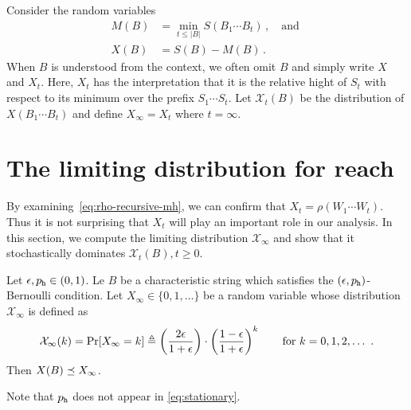   Consider the random variables 
  \begin{align}
    M(B) &= \min_{t \leq |B|} S(B_1 \cdots B_t)\,, \quad\text{and } \\
    X(B) &= S(B) - M(B)\,. \label{eq:X-walk}
  \end{align}
  When $B$ is understood from the context, we often omit $B$ and simply write $X$ and $X_t$.
  Here, $X_t$ has the interpretation that it is the relative hight of $S_t$ 
  with respect to its minimum over the prefix $S_1 \cdots S_t$. 
  Let $\mathcal{X}_t(B)$ be the distribution of $X(B_1 \cdots B_t)$ 
  and define $X_\infty = X_t$ where $t = \infty$. 


  \section{The limiting distribution for reach}\label{sec:stationary-dist-reach}
  By examining~\eqref{eq:rho-recursive-mh}, 
  we can confirm that $X_t = \rho(W_1 \cdots W_t)$. 
  Thus it is not surprising that $X_t$ will play an important role in our analysis.
  In this section, 
  we compute the limiting distribution $\mathcal{X}_\infty$ 
  and show that it stochastically dominates $\mathcal{X}_t(B), t \geq 0$.




  \begin{lemma}\label{lemma:rho-stationary}
    Let $\epsilon, p_{\mathtt{h}} \in (0,1)$. 
    Le $B$ be a characteristic string which satisfies the $(\epsilon, p_{\mathtt{h}})$-Bernoulli condition. 
    Let $X_\infty \in \{0, 1, \ldots\}$ be a random variable 
    whose distribution $\mathcal{X}_\infty$ is defined as 
      \begin{equation}
        \label{eq:stationary}
        \mathcal{X}_\infty(k) 
          = \Pr[X_\infty = k] 
          \defeq \left(\frac{2\epsilon}{1+\epsilon}\right)\cdot \left(\frac{1-\epsilon}{1 + \epsilon}\right)^k
          \qquad \text{for $k = 0, 1, 2, \ldots$}\ 
        \,.
      \end{equation}
    Then $X(B) \preceq X_\infty$.
  \end{lemma}
  Note that $p_{\mathtt{h}}$ does not appear in \eqref{eq:stationary}.

